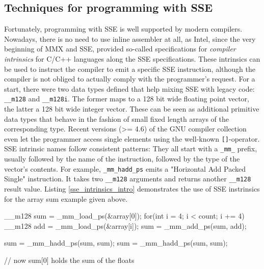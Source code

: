 \subsection{Techniques for programming with SSE}
Fortunately, programming with SSE is well supported by modern compilers. Nowadays, there is no need to use inline assembler at all, as Intel, since the very beginning of MMX and SSE, provided so-called specifications for \emph{compiler intrinsics} for C/C++ languages along the SSE specifications. These intrinsics can be used to instruct the compiler to emit a specific SSE instruction, although the compiler is not obliged to actually comply with the programmer's request. For a start, there were two data types defined that help mixing SSE with legacy code: \texttt{\_\_m128} and \texttt{\_\_m128i}. The former maps to a 128 bit wide floating point vector, the latter a 128 bit wide integer vector. These can be seen as additional primitive data types that behave in the fashion of small fixed length arrays of the corresponding type. Recent versions (>= 4.6) of the GNU compiler collection even let the programmer access single elements using the well-known \texttt{[]}-operator. SSE intrinsic names follow consistent patterns: They all start with a \texttt{\_mm\_} prefix, usually followed by the name of the instruction, followed by the type of the vector's contents. For example, \texttt{\_mm\_hadd\_ps} emits a "Horizontal Add Packed Single" instruction. It takes two \texttt{\_\_m128} arguments and returns another \texttt{\_\_m128} result value. Listing \ref{sse_intrinsics_intro} demonstrates the use of SSE instrinsics for the array sum example given above.
\begin{code}[caption={Array sum using SSE instrinsics}, label=sse_intrinsics_intro]
  __m128 sum = _mm_load_ps(&array[0]);
  for(int i = 4; i < count; i += 4) {
    __m128 add = _mm_load_ps(&array[i]);
    sum = _mm_add_ps(sum, add);
  }

  sum = _mm_hadd_ps(sum, sum);
  sum = _mm_hadd_ps(sum, sum);

  // now sum[0] holds the sum of the floats
\end{code}

